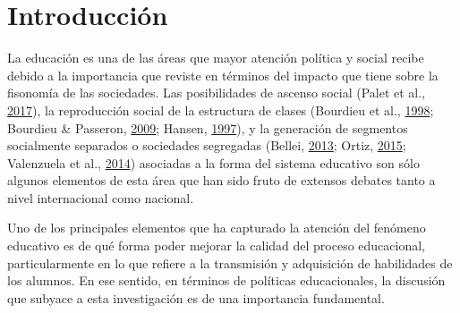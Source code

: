 \documentclass[
]{article}
\begin{document}
\hypertarget{introducciuxf3n}{%
\section{Introducción}\label{introducciuxf3n}}

La educación es una de las áreas que mayor atención política y social
recibe debido a la importancia que reviste en términos del impacto que
tiene sobre la fisonomía de las sociedades. Las posibilidades de ascenso
social (Palet et al.,
\protect\hyperlink{ref-palet_desiguales_2017}{2017}), la reproducción
social de la estructura de clases (Bourdieu et al.,
\protect\hyperlink{ref-bourdieu_reproduccion_1998}{1998}; Bourdieu \&
Passeron, \protect\hyperlink{ref-bourdieu_herederos_2009}{2009}; Hansen,
\protect\hyperlink{ref-hansen_social_1997}{1997}), y la generación de
segmentos socialmente separados o sociedades segregadas (Bellei,
\protect\hyperlink{ref-bellei_estudio_2013}{2013}; Ortiz,
\protect\hyperlink{ref-ortiz_escuelas_2015}{2015}; Valenzuela et al.,
\protect\hyperlink{ref-valenzuela_socioeconomic_2014}{2014}) asociadas a
la forma del sistema educativo son sólo algunos elementos de esta área
que han sido fruto de extensos debates tanto a nivel internacional como
nacional.

Uno de los principales elementos que ha capturado la atención del
fenómeno educativo es de qué forma poder mejorar la calidad del proceso
educacional, particularmente en lo que refiere a la transmisión y
adquisición de habilidades de los alumnos. En ese sentido, en términos
de políticas educacionales, la discusión que subyace a esta
investigación es de una importancia fundamental.
\end{document}
